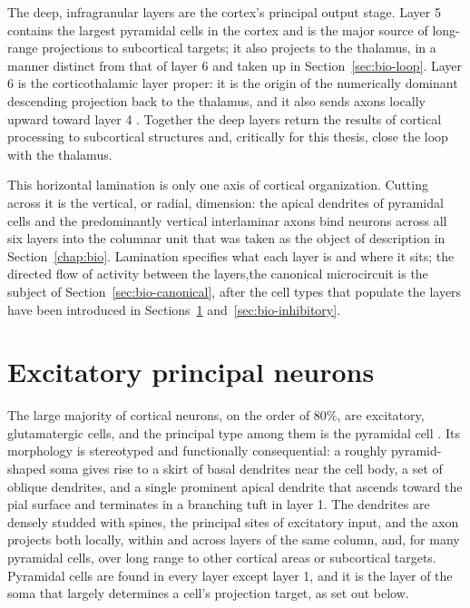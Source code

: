 The deep, infragranular layers are the cortex's principal output stage. Layer 5 contains the largest pyramidal cells in the cortex and is the major source of long-range projections to subcortical targets; it also projects to the thalamus, in a manner distinct from that of layer 6 and taken up in Section~\ref{sec:bio-loop}. Layer 6 is the corticothalamic layer proper: it is the origin of the numerically dominant descending projection back to the thalamus, and it also sends axons locally upward toward layer 4 \parencite{shepherd2018, sherman1998}. Together the deep layers return the results of cortical processing to subcortical structures and, critically for this thesis, close the loop with the thalamus.

This horizontal lamination is only one axis of cortical organization. Cutting across it is the vertical, or radial, dimension: the apical dendrites of pyramidal cells and the predominantly vertical interlaminar axons bind neurons across all six layers into the columnar unit that was taken as the object of description in Section~\ref{chap:bio}. Lamination specifies what each layer is and where it sits; the directed flow of activity between the layers,the canonical microcircuit is the subject of Section~\ref{sec:bio-canonical}, after the cell types that populate the layers have been introduced in Sections~\ref{sec:bio-excitatory} and~\ref{sec:bio-inhibitory}.

\section{Excitatory principal neurons}
\label{sec:bio-excitatory}

The large majority of cortical neurons, on the order of 80\%, are excitatory, glutamatergic cells, and the principal type among them is the pyramidal cell \parencite{white1989, shepherd2018}. Its morphology is stereotyped and functionally consequential: a roughly pyramid-shaped soma gives rise to a skirt of basal dendrites near the cell body, a set of oblique dendrites, and a single prominent apical dendrite that ascends toward the pial surface and terminates in a branching tuft in layer 1. The dendrites are densely studded with spines, the principal sites of excitatory input, and the axon projects both locally, within and across layers of the same column, and, for many pyramidal cells, over long range to other cortical areas or subcortical targets. Pyramidal cells are found in every layer except layer 1, and it is the layer of the soma that largely determines a cell's projection target, as set out below.

